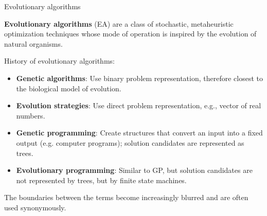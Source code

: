 
\subtitle{Evolutionary Algorithms}




\maketitle



\begin{frame}[containsverbatim]{Evolutionary algorithms}

\textbf{Evolutionary algorithms} (EA) are a class of stochastic, metaheuristic optimization techniques whose mode of operation is inspired by the evolution of natural organisms.

\vspace{0.5cm}

History of evolutionary algorithms:

\begin{itemize}
\item \textbf{Genetic algorithms}: Use binary problem representation, therefore closest to the biological model of evolution.
\item \textbf{Evolution strategies}: Use direct problem representation, e.g., vector of real numbers.
\item \textbf{Genetic programming}: Create structures that convert an input into a fixed output (e.g. computer programs); solution candidates are represented as trees.
\item \textbf{Evolutionary programming}: Similar to GP, but solution candidates are not represented by trees, but by finite state machines.
\end{itemize}

The boundaries between the terms become increasingly blurred and are often used synonymously.
\end{frame}

